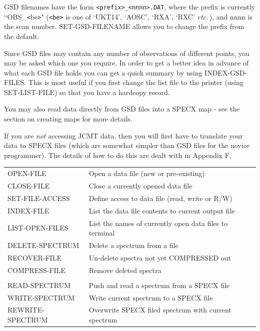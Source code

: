 \documentclass[11pt,twoside]{report}
\newcommand{\etc}{{\it etc.\,}}
\begin{document}
GSD filenames have the form \verb+<prefix>_<nnnn>.DAT+, where the
prefix is currently ``OBS\_\verb+<+be\verb+>+"  (\verb+<be>+ is one of
`UKT14', `AOSC', `RXA', `RXC' \etc), and nnnn is the scan number.
SET-GSD-FILENAME allows you to change the prefix from the default.

Since GSD files may contain any number of observations of
different points, you may be asked which one you require. In order to get a
better idea in advance of what each GSD file holds you can get a quick summary
by using INDEX-GSD-FILES. This is most useful if you first change the list file
to the printer (using SET-LIST-FILE) so that you have a hardcopy record.

You may also read data directly from GSD files into a SPECX map - see the
section on creating maps for more details.

If you are {\em not} accessing JCMT data, then you will first have to translate
your data to SPECX files (which are somewhat simpler than GSD files for the
novice programmer). The details of how to do this are dealt with in Appendix
F.

\begin{tabular}{ll}
OPEN-FILE              & Open a data file (new or pre-existing)\\
CLOSE-FILE             & Close a currently opened data file\\
SET-FILE-ACCESS        & Define access to data file (read, write or R/W)\\
INDEX-FILE             & List the data file contents to current output file\\
LIST-OPEN-FILES        & List the names of currently open data files to terminal\\
DELETE-SPECTRUM        & Delete a spectrum from a file\\
RECOVER-FILE           & Un-delete spectra not yet COMPRESSED out\\
COMPRESS-FILE          & Remove deleted spectra\\
\\
READ-SPECTRUM          & Push and read a spectrum from a SPECX file \\
WRITE-SPECTRUM         & Write current spectrum to a SPECX file\\
REWRITE-SPECTRUM       & Overwrite SPECX filed spectrum with current spectrum\\
\end{tabular}
\end{document}
